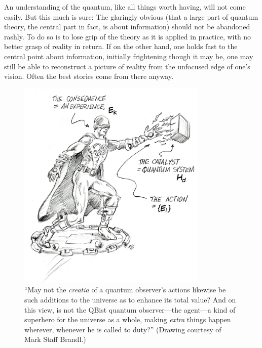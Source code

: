 \documentclass[aps,pra,superscriptaddress,10pt,tightenlines,twocolumn,nofootinbib]{revtex4}
\begin{document}
An understanding of the quantum, like all things worth having, will not come easily.  But this much is sure:  The glaringly obvious (that a large part of quantum theory, the central part in fact, is about information) should not be abandoned rashly.  To do so is to lose grip of the theory as it is applied in practice, with no better grasp of reality in return.  If on the other hand, one holds fast to the central point about information, initially frightening though it may be, one may still be able to reconstruct a picture of reality from the unfocused edge of one's vision.  Often the best stories come from there anyway.


\begin{figure}[h]
\begin{center}
\includegraphics[height=4.0in]{BrandlSketch.jpg}
\end{center}
\caption{``May not the {\it creatia\/} of a quantum observer's actions likewise be such additions to the universe as to enhance its total value?  And on this view, is not the QBist quantum observer---the agent---a kind of superhero for the universe as a whole, making {\it extra\/} things happen wherever, whenever he is called to duty?'' {\footnotesize (Drawing courtesy of Mark Staff Brandl.)}}
\end{figure}
\end{document}
